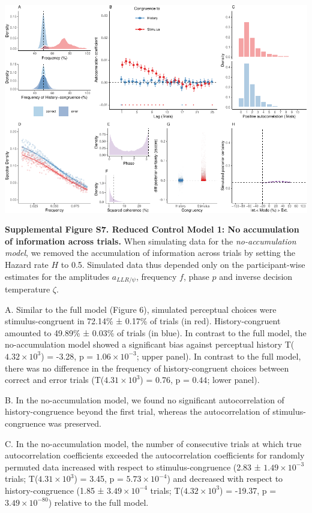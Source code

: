 \documentclass[
]{article}
\begin{document}
\includegraphics{modes_mouse_files/figure-latex/Supplemental_Figure_S7-1.pdf}

\textbf{Supplemental Figure S7. Reduced Control Model 1: No accumulation
of information across trials.} When simulating data for the
\emph{no-accumulation model}, we removed the accumulation of information
across trials by setting the Hazard rate \(H\) to 0.5. Simulated data
thus depended only on the participant-wise estimates for the amplitudes
\(a_{LLR/\psi}\), frequency \(f\), phase \(p\) and inverse decision
temperature \(\zeta\).

A. Similar to the full model (Figure 6), simulated perceptual choices
were stimulus-congruent in 72.14\% ± 0.17\% of trials (in red).
History-congruent amounted to 49.89\% ± 0.03\% of trials (in blue). In
contrast to the full model, the no-accumulation model showed a
significant bias against perceptual history
T(\ensuremath{4.32\times 10^{3}}) = -3.28, p =
\(\ensuremath{1.06\times 10^{-3}}\); upper panel). In contrast to the
full model, there was no difference in the frequency of
history-congruent choices between correct and error trials
(T(\ensuremath{4.31\times 10^{3}}) = 0.76, p = \(0.44\); lower panel).

B. In the no-accumulation model, we found no significant autocorrelation
of history-congruence beyond the first trial, whereas the
autocorrelation of stimulus-congruence was preserved.

C. In the no-accumulation model, the number of consecutive trials at
which true autocorrelation coefficients exceeded the autocorrelation
coefficients for randomly permuted data increased with respect to
stimulus-congruence (2.83 ± \ensuremath{1.49\times 10^{-3}} trials;
T(\ensuremath{4.31\times 10^{3}}) = 3.45, p =
\(\ensuremath{5.73\times 10^{-4}}\)) and decreased with respect to
history-congruence (1.85 ± \ensuremath{3.49\times 10^{-4}} trials;
T(\ensuremath{4.32\times 10^{3}}) = -19.37, p =
\(\ensuremath{3.49\times 10^{-80}}\)) relative to the full model.
\end{document}
